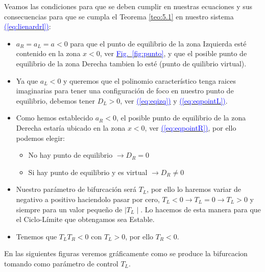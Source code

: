 \documentclass[12pt,a4paper]{report} %
\newcommand{\fref}[1]{\hyperref[#1]{\textcolor{blue}{Fig.~\ref*{#1}}}}
\newcommand{\eref}[1]{\hyperref[#1]{\textcolor{blue}{(\ref*{#1})}}}
\newcommand{\fref}[1]{\hyperref[#1]{\textcolor{blue}{\textit{Fig.~\ref*{#1}}}}}
\newcommand{\eref}[1]{\hyperref[#1]{\textcolor{blue}{\textit{(\ref*{#1})}}}}
\begin{document}
	Veamos las condiciones para que se deben cumplir en nuestras ecuaciones y sus consecuencias para que se cumpla el Teorema \ref{teo:5.1} en nuestro sistema \eref{eq:lienardrl}:
		\begin{itemize}
			\item $a_R=a_L=a<0$ para que el punto de equilibrio de la zona Izquierda esté contenido en la zona $x<0$, ver \fref{fig:punto}, y que el posible punto de equilibrio de la zona Derecha tambien lo esté (punto de quilibrio virtual).
			\item Ya que $a_L<0$ y queremos que el polinomio característico  tenga raices imaginarias para tener una configuración de foco en nuestro punto de equilibrio, debemos tener $D_L>0$, ver \eref{eq:eqizq} y \eref{eq:eqpointL}.
			\item Como hemos establecido $a_R<0$, el posible punto de equilibrio de la zona Derecha estaría ubicado en la zona $x<0$, ver \eref{eq:eqpointR}, por ello podemos elegir:\begin{itemize}
				\item No hay punto de equilibrio $\rightarrow D_R=0$ 
				\item Si hay punto de equilibrio y es virtual $\rightarrow D_R\neq0$ 
			\end{itemize}

			\item Nuestro parámetro de bifurcación será $T_L$, por ello lo haremos variar de negativo a positivo haciendolo pasar por cero, $T_L<0 \rightarrow T_L=0 \rightarrow T_L>0$ y siempre para un valor pequeño de $\mid T_L \mid$. Lo hacemos de esta manera para que el Ciclo-Límite que obtengamos sea Estable.
			\item Tenemos que $T_LT_R<0$ con $T_L>0$, por ello  $T_R<0$.
		\end{itemize}
		
		
	\vspace{0.5cm} En las siguientes figuras veremos gráficamente como se produce la bifurcacion tomando como parámetro de control $T_L$.
		
	\newpage
	
\end{document}
